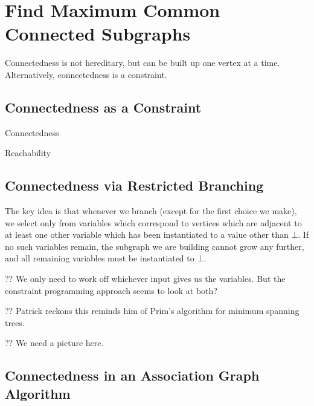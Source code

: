\documentclass{llncs}
\begin{document}
\section{Find Maximum Common Connected Subgraphs}

Connectedness is not hereditary, but can be built up one vertex at a time. Alternatively,
connectedness is a constraint.

\subsection{Connectedness as a Constraint}

Connectedness \cite{Brown:2005}

Reachability \cite{DBLP:conf/cp/DoomsDD05,DBLP:conf/cp/QuesadaRD05}

\subsection{Connectedness via Restricted Branching}

The key idea is that whenever we branch (except for the first choice we make), we select only from
variables which correspond to vertices which are adjacent to at least one other variable which has
been instantiated to a value other than $\bot$. If no such variables remain, the subgraph we are building
cannot grow any further, and all remaining variables must be instantiated to $\bot$.

?? We only need to work off whichever input gives us the variables. But the constraint programming approach seems to
look at both?

?? Patrick reckons this reminds him of Prim's algorithm for minimum spanning trees.

?? We need a picture here.

\subsection{Connectedness in an Association Graph Algorithm}
\end{document}
